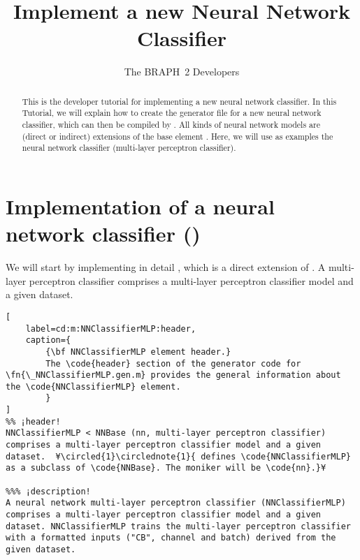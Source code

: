 \documentclass{tufte-handout}
\title{Implement a new Neural Network Classifier}
\author[The BRAPH~2 Developers]{The BRAPH~2 Developers}
\begin{document}
\maketitle

\begin{abstract}
\noindent
This is the developer tutorial for implementing a new neural network classifier. 
In this Tutorial, we will explain how to create the generator file  for a new neural network classifier, which can then be compiled by . All kinds of neural network models are (direct or indirect) extensions of the base element . Here, we will use as examples the neural network classifier  (multi-layer perceptron classifier).
\end{abstract}

\tableofcontents

\clearpage

\section{Implementation of a neural network classifier ()}

We will start by implementing in detail , which is a direct extension of .
A multi-layer perceptron classifier  comprises a multi-layer perceptron classifier model and a given dataset.

\begin{lstlisting}[
	label=cd:m:NNClassifierMLP:header,
	caption={
		{\bf NNClassifierMLP element header.}
		The \code{header} section of the generator code for \fn{\_NNClassifierMLP.gen.m} provides the general information about the \code{NNClassifierMLP} element.
		}
]
%% ¡header!
NNClassifierMLP < NNBase (nn, multi-layer perceptron classifier) comprises a multi-layer perceptron classifier model and a given dataset.  ¥\circled{1}\circlednote{1}{ defines \code{NNClassifierMLP} as a subclass of \code{NNBase}. The moniker will be \code{nn}.}¥

%%% ¡description!
A neural network multi-layer perceptron classifier (NNClassifierMLP) comprises a multi-layer perceptron classifier model and a given dataset. NNClassifierMLP trains the multi-layer perceptron classifier with a formatted inputs ("CB", channel and batch) derived from the given dataset.
\end{lstlisting}
\end{document}
